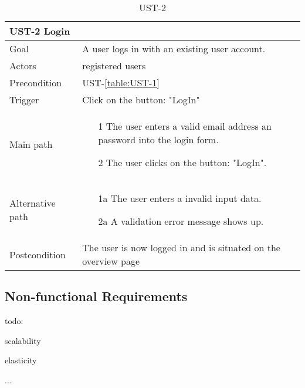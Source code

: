 \documentclass[titlepage, 12pt]{article}
\begin{document}
\begin{table}[H]
    \begin{center}

        \begin{tabular}{p{4cm}|p{10cm}}
            \textbf{UST-2 Login}\\
            \hline
            Goal & A user logs in with an existing user account. \\
            \hline
            Actors & registered users \\
            \hline
            Precondition  & UST-\ref{table:UST-1} \\
            \hline
            Trigger & Click on the button: "LogIn" \\
            \hline
            Main path & 
            \begin{itemize}
                \item [1] The user enters a valid email address an password into the login form.
                \item [2] The user clicks on the button: "LogIn".
            \end{itemize} \\
            \hline
            Alternative path & 
            \begin{itemize}
                \item [1a] The user enters a invalid input data.
                \item [2a] A validation error message shows up.
            \end{itemize} \\
            \hline
            Postcondition & The user is now logged in and is situated on the overview page \\
        \end{tabular}

        \caption{UST-2}
    \label{table:UST-2}
        
    \end{center}
\end{table}



\subsection{Non-functional Requirements}

todo:

scalability

elasticity

...

\pagebreak

\listoftables

\pagebreak



\end{document}
